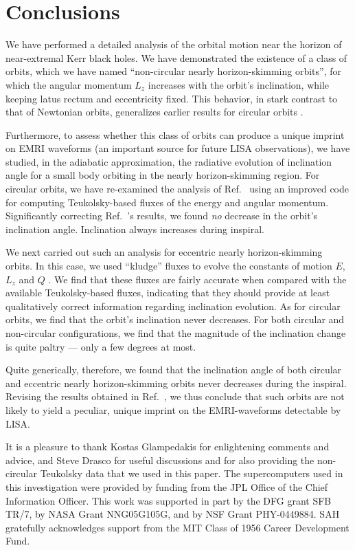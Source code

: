\documentclass[aps,prd,twocolumn,showpacs,groupedaddress,nofootinbib]{revtex4}
\begin{document}
\section{\label{sec:conclusions}Conclusions}


We have performed a detailed analysis of the orbital motion near the
horizon of near-extremal Kerr black holes.  We have demonstrated the
existence of a class of orbits, which we have named ``non-circular
nearly horizon-skimming orbits'', for which the angular momentum $L_z$
increases with the orbit's inclination, while keeping latus rectum and
eccentricity fixed.  This behavior, in stark contrast to that of
Newtonian orbits, generalizes earlier results for circular orbits
\cite{skimming}.

Furthermore, to assess whether this class of orbits can produce a
unique imprint on EMRI waveforms (an important source for future LISA
observations), we have studied, in the adiabatic approximation, the radiative evolution of inclination
angle for a small body orbiting in the nearly horizon-skimming region.
For circular orbits, we have re-examined the analysis of Ref.\
\cite{skimming} using an improved code for computing Teukolsky-based
fluxes of the energy and angular momentum.  Significantly correcting
Ref.\ {\cite{skimming}}'s results, we found {\it no} decrease in the
orbit's inclination angle.  Inclination always increases during
inspiral.

We next carried out such an analysis for eccentric nearly
horizon-skimming orbits. In this case, we used ``kludge'' fluxes to
evolve the constants of motion $E$, $L_z$ and $Q$
{\cite{GG_kludge_fluxes}}.  We find that these fluxes are fairly
accurate when compared with the available Teukolsky-based fluxes,
indicating that they should provide at least qualitatively correct information
regarding inclination evolution.  As for circular orbits, we find that
the orbit's inclination never decreases.  For both circular and
non-circular configurations, we find that the magnitude of the
inclination change is quite paltry --- only a few degrees at most.

Quite generically, therefore, we found that the inclination angle of
both circular and eccentric nearly horizon-skimming orbits never
decreases during the inspiral.  Revising the results obtained in Ref.\
\cite{skimming}, we thus conclude that such orbits are not likely to
yield a peculiar, unique imprint on the EMRI-waveforms detectable by
LISA.

\begin{acknowledgments}
  It is a pleasure to thank Kostas Glampedakis for enlightening
  comments and advice, and Steve Drasco for useful discussions and for
  also providing the non-circular Teukolsky data that we used in this
  paper. The supercomputers used in this investigation were provided
  by funding from the JPL Office of the Chief Information Officer.
  This work was supported in part by the DFG grant SFB TR/7, by NASA
  Grant NNG05G105G, and by NSF Grant PHY-0449884.  SAH gratefully
  acknowledges support from the MIT Class of 1956 Career Development
  Fund.
\end{acknowledgments}
\end{document}
